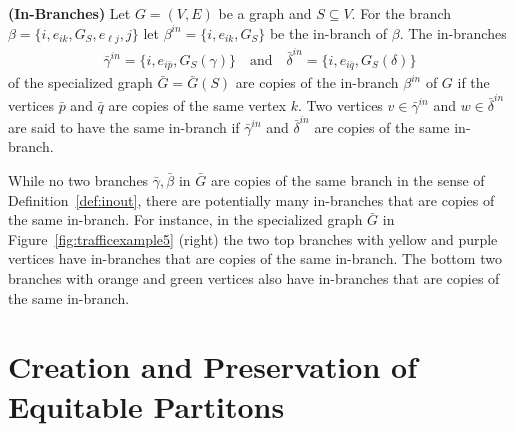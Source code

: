 \documentclass[12pt]{thesis}
\begin{document}
\begin{definition}\label{def:inout}\textbf{(In-Branches)}
Let $G=(V,E)$ be a graph and $S\subseteq V$.
For the branch $\beta = \{i,e_{ik},G_S,e_{\ell j},j\}$ let $\beta^{in}=\{i,e_{ik},G_S\}$
be the {in-branch} of $\beta$.
The in-branches  
\begin{align*}
    \bar{\gamma}^{in}=\{i,e_{i\bar{p}},G_S(\gamma)\} \quad \text{and} \quad \bar{\delta}^{in}=\{i,e_{i\bar{q}},G_S(\delta)\}
\end{align*}
of the specialized graph $\bar{G}=\bar{G}(S)$ are {copies} of the in-branch $\beta^{in}$ of $G$ if the vertices $\bar{p}$ and $\bar{q}$ are copies of the same vertex $k$.
Two vertices $v\in\bar{\gamma}^{in}$ and $w\in\bar{\delta}^{in}$ are said to have the same in-branch if $\bar{\gamma}^{in}$ and $\bar{\delta}^{in}$ are copies of the same in-branch.
\end{definition}


While no two branches $\bar{\gamma},\bar{\beta}$ in $\bar{G}$ are copies of the same branch in the sense of Definition~\ref{def:inout}, there are potentially many in-branches that are copies of the same in-branch.
For instance, in the specialized graph $\bar{G}$ in Figure~\ref{fig:trafficexample5} (right) the two top branches with yellow and purple vertices have in-branches that are copies of the same in-branch.
The bottom two branches with orange and green vertices also have in-branches that are copies of the same in-branch. 

\section{Creation and Preservation of Equitable Partitons}
\end{document}
